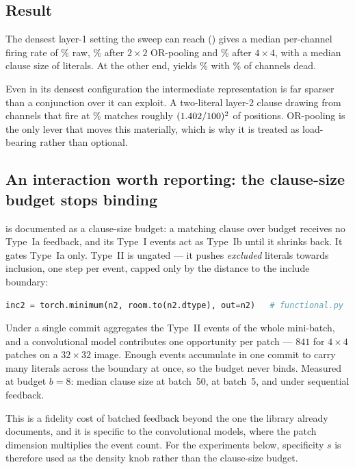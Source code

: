 \subsection{Result}

The densest layer-1 setting the sweep can reach (\densityDensestLabel{}) gives a median
per-channel firing rate of \densityDensestFireRaw{}\% raw, \densityDensestFire{}\% after
$2\times2$ OR-pooling and \densityDensestFirePoolFour{}\% after $4\times4$, with a median
clause size of \densityDensestIncludes{} literals. At the other end,
\densitySparsestLabel{} yields \densitySparsestFire{}\% with
\densitySparsestDead{}\% of channels dead.

\begin{ttkey}
Even in its densest configuration the intermediate representation is far sparser than a
conjunction over it can exploit. A two-literal layer-2 clause drawing from channels that fire
at \densityDensestFire{}\% matches roughly
$(1.402{}/100)^2$ of positions. OR-pooling is the only lever that moves this
materially, which is why it is treated as load-bearing rather than optional.
\end{ttkey}

\subsection{An interaction worth reporting: the clause-size budget stops binding}
\label{sec:budgetbug}

 is documented as a clause-size budget: a matching clause over
budget receives no Type~Ia feedback, and its Type~I events act as Type~Ib until it shrinks
back. It gates Type~Ia only. Type~II is ungated --- it pushes \emph{excluded} literals
towards inclusion, one step per event, capped only by the distance to the include boundary:

\begin{lstlisting}[language=Python]
inc2 = torch.minimum(n2, room.to(n2.dtype), out=n2)   # functional.py
\end{lstlisting}

Under  a single commit aggregates the Type~II events of the
whole mini-batch, and a convolutional model contributes one opportunity per patch --- $841$
for $4\times4$ patches on a $32\times32$ image. Enough events accumulate in one commit to
carry many literals across the boundary at once, so the budget never binds. Measured at
budget $b=8$: median clause size \incBudgetBatchFifty{} at batch~50,
\incBudgetBatchFive{} at batch~5, and \incBudgetSeq{} under sequential feedback.

This is a fidelity cost of batched feedback beyond the one the library already documents, and
it is specific to the convolutional models, where the patch dimension multiplies the event
count. For the experiments below, specificity $s$ is therefore used as the density knob
rather than the clause-size budget.
